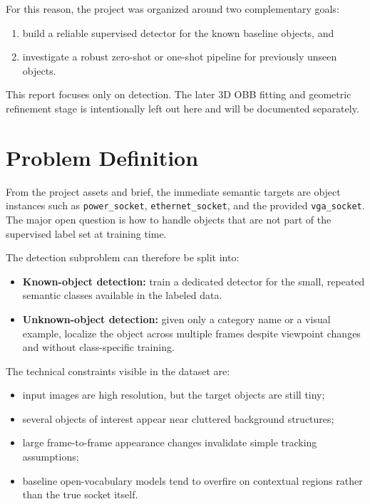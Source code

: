 \documentclass[11pt,a4paper]{article}
\begin{document}
For this reason, the project was organized around two complementary goals:
\begin{enumerate}[leftmargin=1.5em]
  \item build a reliable supervised detector for the known baseline objects, and
  \item investigate a robust zero-shot or one-shot pipeline for previously unseen objects.
\end{enumerate}

This report focuses only on detection. The later 3D OBB fitting and geometric refinement stage is intentionally left out here and will be documented separately.

\section{Problem Definition}

From the project assets and brief, the immediate semantic targets are object instances such as \texttt{power\_socket}, \texttt{ethernet\_socket}, and the provided \texttt{vga\_socket}. The major open question is how to handle objects that are not part of the supervised label set at training time.

The detection subproblem can therefore be split into:
\begin{itemize}[leftmargin=1.5em]
  \item \textbf{Known-object detection:} train a dedicated detector for the small, repeated semantic classes available in the labeled data.
  \item \textbf{Unknown-object detection:} given only a category name or a visual example, localize the object across multiple frames despite viewpoint changes and without class-specific training.
\end{itemize}

The technical constraints visible in the dataset are:
\begin{itemize}[leftmargin=1.5em]
  \item input images are high resolution, but the target objects are still tiny;
  \item several objects of interest appear near cluttered background structures;
  \item large frame-to-frame appearance changes invalidate simple tracking assumptions;
  \item baseline open-vocabulary models tend to overfire on contextual regions rather than the true socket itself.
\end{itemize}
\end{document}

